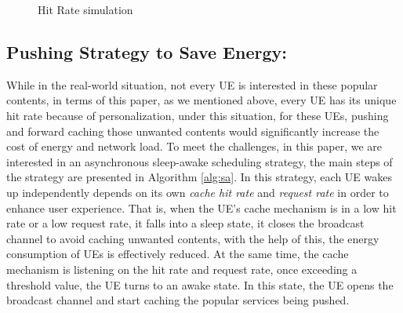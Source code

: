 \documentclass[conference]{IEEEtran}
\begin{document}
\begin{figure}[!h]
 \caption{Hit Rate simulation}
\label{Fig.3}
\end{figure}

 \subsection{Pushing Strategy to Save Energy:}
While in the real-world situation, not every UE is interested in these popular contents, in terms of this paper, as we mentioned above, every UE has its unique hit rate because of personalization, under this situation, for these UEs, pushing and forward caching those unwanted contents would significantly increase the cost of energy and network load.
To meet the challenges, in this paper, we are interested in an asynchronous sleep-awake scheduling strategy, the main steps of the strategy are presented in Algorithm \ref{alg:sa}. In this strategy, each UE wakes up independently depends on its own \emph{cache hit rate} and \emph{request rate} in order to enhance user experience. That is, when the UE's cache mechanism is in a low hit rate or a low request rate, it falls into a sleep state, it closes the broadcast channel to avoid caching unwanted contents, with the help of this, the energy consumption of UEs is effectively reduced. At the same time, the cache mechanism is listening on the hit rate and request rate, once exceeding a threshold value, the UE turns to an awake state. In this state, the UE opens the broadcast channel and start caching the popular services being pushed. 
\end{document}

